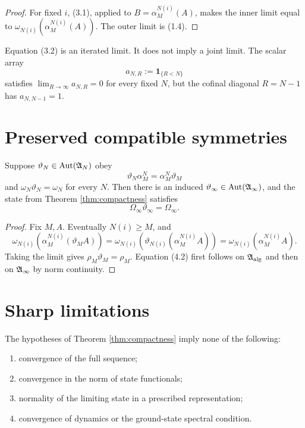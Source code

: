 \documentclass[11pt,a4paper]{article}
\begin{document}
\begin{proof}
For fixed \(i\), (3.1), applied to
\(B=\alpha_M^{N(i)}(A)\), makes the inner limit equal to
\(\omega_{N(i)}(\alpha_M^{N(i)}(A))\).  The outer limit is (1.4).
\end{proof}

\begin{remark}
Equation (3.2) is an iterated limit.  It does not imply a joint limit.  The scalar
array
\[
 a_{N,R}:=\mathbf1_{\{R<N\}}                                   \tag{3.3}
\]
satisfies \(\lim_{R\to\infty}a_{N,R}=0\) for every fixed \(N\), but the cofinal
diagonal \(R=N-1\) has \(a_{N,N-1}=1\).
\end{remark}

\section{Preserved compatible symmetries}

\begin{proposition}
Suppose \(\vartheta_N\in\operatorname{Aut}(\mathfrak A_N)\) obey
\[
 \vartheta_N\alpha_M^N=\alpha_M^N\vartheta_M                  \tag{4.1}
\]
and \(\omega_N\vartheta_N=\omega_N\) for every \(N\).  Then there is an induced
\(\vartheta_\infty\in\operatorname{Aut}(\mathfrak A_\infty)\), and the state from
Theorem \ref{thm:compactness} satisfies
\[
 \Omega_\infty\vartheta_\infty=\Omega_\infty.                  \tag{4.2}
\]
\end{proposition}

\begin{proof}
Fix \(M,A\).  Eventually \(N(i)\ge M\), and
\[
 \omega_{N(i)}(\alpha_M^{N(i)}(\vartheta_MA))
 =\omega_{N(i)}(\vartheta_{N(i)}(\alpha_M^{N(i)}A))
 =\omega_{N(i)}(\alpha_M^{N(i)}A).                             \tag{4.3}
\]
Taking the limit gives \(\rho_M\vartheta_M=\rho_M\).  Equation (4.2) first
follows on \(\mathfrak A_{\rm alg}\) and then on \(\mathfrak A_\infty\) by norm continuity.
\end{proof}

\section{Sharp limitations}

\begin{proposition}
The hypotheses of Theorem \ref{thm:compactness} imply none of the following:
\begin{enumerate}
\item convergence of the full sequence;
\item convergence in the norm of state functionals;
\item normality of the limiting state in a prescribed representation;
\item convergence of dynamics or the ground-state spectral condition.
\end{enumerate}
\end{proposition}
\end{document}
